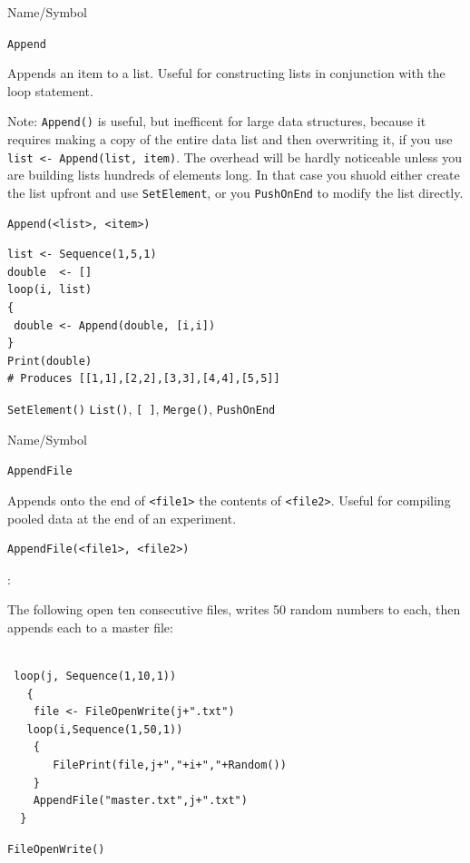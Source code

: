 \begin{desc}{Name/Symbol}

\item[Name/Symbol]  	\verb+Append+
  
\item[Description]  	Appends an item to a list.  Useful for constructing lists in conjunction with the loop statement.

Note: \texttt{Append()} is useful, but inefficent for large data structures, because it requires making a copy of the entire data list and then overwriting it, if you use
\texttt{list <- Append(list, item)}.  The overhead will be hardly noticeable unless you are building lists hundreds of elements long.  In that case you shuold either create the list upfront and use \texttt{SetElement}, or you \texttt{PushOnEnd} to modify the list directly.

\item[Usage] 
\begin{verbatim}
Append(<list>, <item>)
\end{verbatim}

\item[Example]
\begin{verbatim}
list <- Sequence(1,5,1)
double  <- []
loop(i, list)
{
 double <- Append(double, [i,i])
}
Print(double)
# Produces [[1,1],[2,2],[3,3],[4,4],[5,5]]
\end{verbatim}

\item[See Also]  \verb+SetElement()+ \verb+List()+, \verb+[ ]+, \verb+Merge()+, \verb+PushOnEnd+
\end{desc}



\begin{desc}{Name/Symbol}

\item[Name/Symbol]  	\verb+AppendFile+
  
\item[Description]  	Appends onto the end of \verb+<file1>+ the contents of \verb+<file2>+.  Useful for compiling pooled data at the end of an experiment.

\item[Usage] 
\begin{verbatim}
AppendFile(<file1>, <file2>)
\end{verbatim}

\item[Example]:

The following open ten consecutive files, writes 50 random numbers to each, then appends each to a master file:

\begin{verbatim}

 loop(j, Sequence(1,10,1))
   {
    file <- FileOpenWrite(j+".txt")
   loop(i,Sequence(1,50,1))
    {
       FilePrint(file,j+","+i+","+Random())
    }
    AppendFile("master.txt",j+".txt")
  }
\end{verbatim}

\item[See Also]     	\verb+FileOpenWrite()+
\end{desc}






